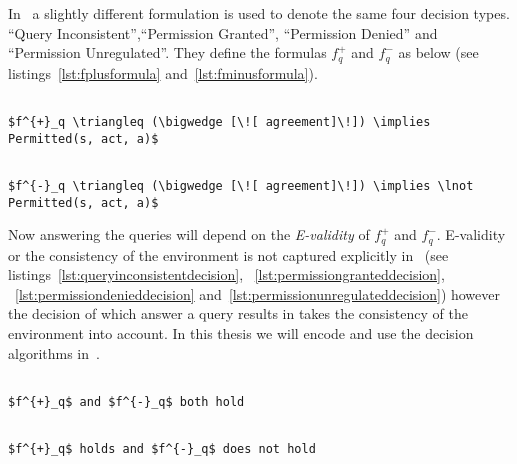 In~\cite{pucella2006} a slightly different formulation is used to denote the same four decision types. ``Query Inconsistent'',``Permission Granted'', ``Permission Denied'' and ``Permission Unregulated''. They define the formulas $f^{+}_q$ and $f^{-}_q$ as below (see listings~\ref{lst:fplusformula} and~\ref{lst:fminusformula}).

\lstset{mathescape, language=AST} 
\begin{lstlisting}[frame=single, caption={$f^{+}_q$},label={lst:fplusformula}]

$f^{+}_q \triangleq (\bigwedge [\![ agreement]\!]) \implies Permitted(s, act, a)$ 

\end{lstlisting}

\lstset{mathescape, language=AST} 
\begin{lstlisting}[frame=single, caption={$f^{-}_q$},label={lst:fminusformula}]

$f^{-}_q \triangleq (\bigwedge [\![ agreement]\!]) \implies \lnot Permitted(s, act, a)$ 

\end{lstlisting}

Now answering the queries will depend on the \emph{E-validity} of $f^{+}_q$ and $f^{-}_q$. E-validity or the consistency of the environment is not captured explicitly in~\cite{pucella2006} (see listings~\ref{lst:queryinconsistentdecision}, ~\ref{lst:permissiongranteddecision}, ~\ref{lst:permissiondenieddecision} and~\ref{lst:permissionunregulateddecision}) however the decision of which answer a query results in takes the consistency of the environment into account. In this thesis we will encode and use the decision algorithms in~\cite{pucella2006}.


\lstset{mathescape, language=AST} 
\begin{lstlisting}[frame=single, caption={Answerable Queries: Query Inconsistent},label={lst:queryinconsistentdecision}]

$f^{+}_q$ and $f^{-}_q$ both hold

\end{lstlisting}

\lstset{mathescape, language=AST} 
\begin{lstlisting}[frame=single, caption={Answerable Queries: Permission Granted},label={lst:permissiongranteddecision}]

$f^{+}_q$ holds and $f^{-}_q$ does not hold

\end{lstlisting}

